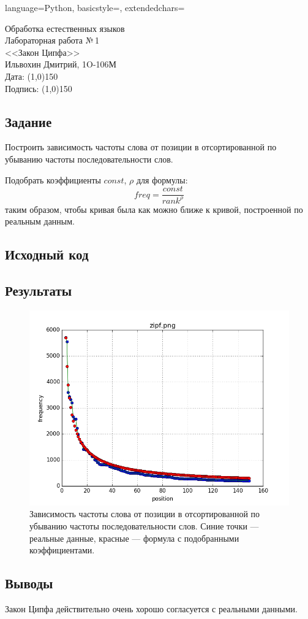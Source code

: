 \documentclass[12pt]{article}
\newcommand{\StudentName}{Ильвохин Дмитрий}
\newcommand{\Group}{1O-106М}
\newcommand{\CourseName}{Обработка естественных языков}
\newcommand{\LabNum}{1}
\newcommand{\Subject}{Закон Ципфа}
\begin{document}
\lstset
{
        language=Python,
        basicstyle=\footnotesize,%
        extendedchars=\true
}

\begin{flushright}
\Large{
	\CourseName \\
	Лабораторная работа №\,\LabNum \\
	<<\Subject>> \\
  \StudentName, \Group \\
  Дата: \line(1,0){150} \\
  Подпись: \line(1,0){150} \\
}
\end{flushright}

\subsection*{Задание}
Построить зависимость частоты слова от позиции в отсортированной
по убыванию частоты последовательности слов.

Подобрать коэффициенты $const$, $\rho$ для формулы:
$$
freq = \dfrac{const}{rank^\rho}
$$
таким образом, чтобы кривая была как можно ближе к кривой, построенной
по реальным данным.

\subsection*{Исходный код}


\subsection*{Результаты}



\begin{figure}[!htb]
  \centering
  \includegraphics[scale=0.8]{pics/zipf.png}
  \caption{Зависимость частоты слова от позиции в отсортированной по
    убыванию частоты последовательности слов. Синие точки --- реальные данные,
    красные --- формула с подобранными коэффициентами.}
  \label{fig:zipf}
\end{figure}

\subsection*{Выводы}
Закон Ципфа действительно очень хорошо согласуется с реальными данными.
\end{document}
